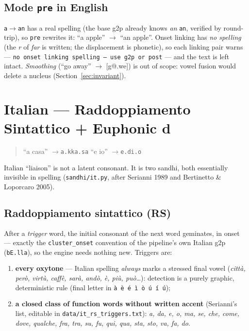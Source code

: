 \documentclass[11pt,a4paper]{report}
\newcommand{\smp}[1]{\texttt{#1}}          %
\begin{document}
\section{Mode \smp{pre} in English}

\smp{a}$\rightarrow$\smp{an} has a real spelling (the base g2p already knows
\emph{an} \smp{an}, verified by round-trip), so \smp{pre} rewrites it:
``a apple'' $\rightarrow$ ``an apple''. Onset linking has \emph{no spelling}
(the \emph{r} of \emph{far} is written; the displacement is phonetic), so
each linking pair warns —
\smp{no onset linking spelling — use g2p or post} — and the text is left
intact. \emph{Smoothing} (``go away'' $\rightarrow$ [g@.we]) is out of
scope: vowel fusion would delete a nucleus (Section~\ref{sec:invariant}).

\chapter{Italian — Raddoppiamento Sintattico + Euphonic d}
\label{chap:it}

\begin{quote}\large
``a casa'' \quad$\rightarrow$\quad \smp{a.kka.sa}\qquad
``e io'' \quad$\rightarrow$\quad \smp{e.di.o}
\end{quote}

\noindent Italian ``liaison'' is not a latent consonant. It is two sandhi,
both essentially invisible in spelling (\smp{sandhi/it.py}, after Serianni
1989 and Bertinetto \& Loporcaro 2005).

\section{Raddoppiamento sintattico (RS)}

After a \emph{trigger} word, the initial consonant of the next word
geminates, in onset — exactly the \smp{cluster\_onset} convention of the
pipeline's own Italian g2p (\smp{bE.lla}), so the engine needs nothing new.
Triggers are:

\begin{enumerate}
  \item \textbf{every oxytone} — Italian spelling \emph{always} marks a
        stressed final vowel (\emph{citt\`a, per\`o, virt\`u, caff\`e,
        sar\`a, and\`o, \`e, pi\`u, pu\`o}\dots): detection is a purely
        graphic, deterministic rule (final letter in
        \smp{\`a \`e \'e \`i \`o \'u \'i \'u});
  \item \textbf{a closed class of function words without written accent}
        (Serianni's list, editable in
        \smp{data/it\_rs\_triggers.txt}): \emph{a, da, e, o, ma, se, che,
        come, dove, qualche, fra, tra, su, fu, qui, qua, sta, sto, va, fa,
        do}.
\end{enumerate}
\end{document}
